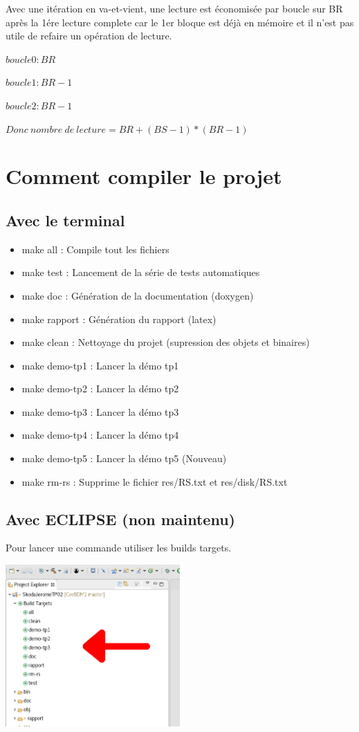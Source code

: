 \documentclass[a4paper]{article}
\begin{document}
Avec une itération en va-et-vient, une lecture est économisée par boucle sur BR après la 1ére lecture complete 
car le 1er bloque est déjà en mémoire et il n'est pas utile de refaire un opération de lecture.

$boucle 0: BR$ 

$boucle 1: BR - 1$ 

$boucle 2: BR - 1$ 


$Donc\ nombre\ de\ lecture = BR + (BS-1) * (BR-1)$

\section{Comment compiler le projet}

\subsection{Avec le terminal}

\begin{itemize}
	\item make all : Compile tout les fichiers
	\item make test : Lancement de la série de tests automatiques
	\item make doc  : Génération de la documentation (doxygen)
	\item make rapport : Génération du rapport (latex)
	\item make clean : Nettoyage du projet (supression des objets et binaires)
	\item make demo-tp1 : Lancer la démo tp1
	\item make demo-tp2 : Lancer la démo tp2
	\item make demo-tp3 : Lancer la démo tp3
	\item make demo-tp4 : Lancer la démo tp4 
	\item make demo-tp5 : Lancer la démo tp5 (Nouveau)
	\item make rm-rs : Supprime le fichier res/RS.txt et res/disk/RS.txt
\end{itemize}

\subsection{Avec ECLIPSE (non maintenu) }

Pour lancer une commande utiliser les builds targets.

\includegraphics[width=0.5\textwidth]{builds-target.png}
\end{document}
